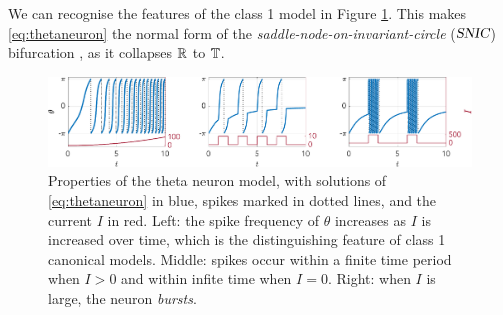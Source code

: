 We can recognise the features of the class 1 model in Figure \ref{fig:ThetaNeuronResponseToCurrent}. This makes \eqref{eq:thetaneuron} the normal form of the \textit{saddle-node-on-invariant-circle} (${\textsl{SNIC}}$) bifurcation \cite{Luke2013}, as it collapses ${\mathbb{R}}$ to ${\mathbb{T}}$.

\begin{figure}[H]
\centering
\includegraphics[width = \textwidth]{../Figures/ThetaNeuronResponseToCurrent.pdf}
\caption{Properties of the theta neuron model, with solutions of \eqref{eq:thetaneuron} in blue, spikes marked in dotted lines, and the current $I$ in red. Left: the spike frequency of $\theta$ increases as $I$ is increased over time, which is the distinguishing feature of class 1 canonical models. Middle: spikes occur within a finite time period when $I > 0$ and within infite time when $I = 0$. Right: when $I$ is large, the neuron \textsl{bursts}.}
\label{fig:ThetaNeuronResponseToCurrent}
\end{figure}

